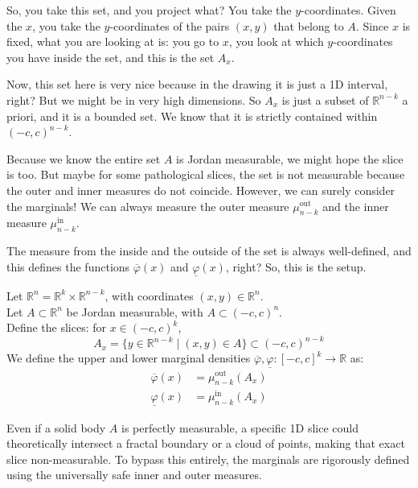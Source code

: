 \begin{spoken-clean}[00:02:20 - 00:04:50]
So, you take this set, and you project what? You take the $y$-coordinates. Given the $x$, you take the $y$-coordinates of the pairs $(x,y)$ that belong to $A$. Since $x$ is fixed, what you are looking at is: you go to $x$, you look at which $y$-coordinates you have inside the set, and this is the set $A_x$. 

Now, this set here is very nice because in the drawing it is just a 1D interval, right? But we might be in very high dimensions. So $A_x$ is just a subset of $\mathbb{R}^{n-k}$ a priori, and it is a bounded set. We know that it is strictly contained within $(-c, c)^{n-k}$. 

Because we know the entire set $A$ is Jordan measurable, we might hope the slice is too. But maybe for some pathological slices, the set is not measurable because the outer and inner measures do not coincide. However, we can surely consider the marginals! We can always measure the outer measure $\mu_{n-k}^{\text{out}}$ and the inner measure $\mu_{n-k}^{\text{in}}$. 

The measure from the inside and the outside of the set is always well-defined, and this defines the functions $\overline{\varphi}(x)$ and $\underline{\varphi}(x)$, right? So, this is the setup.
\end{spoken-clean}

\begin{math-stroke}
Let $\mathbb{R}^n = \mathbb{R}^k \times \mathbb{R}^{n-k}$, with coordinates $(x,y) \in \mathbb{R}^n$. \\
Let $A \subset \mathbb{R}^n$ be Jordan measurable, with $A \subset (-c, c)^n$. \\
Define the slices: for $x \in (-c, c)^k$,
\[
A_x = \{ y \in \mathbb{R}^{n-k} \mid (x,y) \in A \} \subset (-c, c)^{n-k}
\]
We define the upper and lower marginal densities $\overline{\varphi}, \underline{\varphi} : [-c, c]^k \to \mathbb{R}$ as:
\begin{align*}
\overline{\varphi}(x) &= \mu_{n-k}^{\text{out}}(A_x) \\
\underline{\varphi}(x) &= \mu_{n-k}^{\text{in}}(A_x)
\end{align*}

\begin{explanation-of-steps}
Even if a solid body $A$ is perfectly measurable, a specific 1D slice could theoretically intersect a fractal boundary or a cloud of points, making that exact slice non-measurable. To bypass this entirely, the marginals are rigorously defined using the universally safe inner and outer measures.
\end{explanation-of-steps}
\end{math-stroke}

